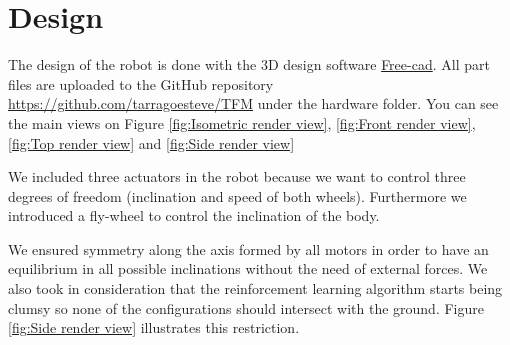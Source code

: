 \section{Design}
The design of the robot is done with the 3D design software \href{https://www.freecadweb.org/}{Free-cad}. All part files are uploaded to the GitHub repository \url{https://github.com/tarragoesteve/TFM} under the hardware folder. You can see the main views on Figure \ref{fig:Isometric render view}, \ref{fig:Front render view}, \ref{fig:Top render view} and \ref{fig:Side render view}

We included three actuators in the robot because we want to control three degrees of freedom (inclination and speed of both wheels). Furthermore we introduced a fly-wheel to control the inclination of the body. 

We ensured symmetry along the axis formed by all motors in order to have an equilibrium in all possible inclinations without the need of external forces. We also took in consideration that the reinforcement learning algorithm starts being clumsy so none of the configurations should intersect with the ground. Figure \ref{fig:Side render view} illustrates this restriction.   

